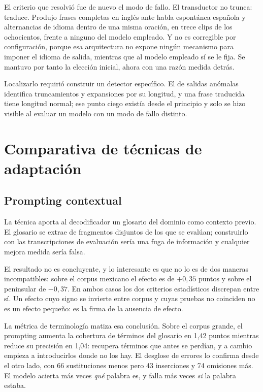 El criterio que resolvió fue de nuevo el modo de fallo. El transductor no trunca: traduce.
Produjo frases completas en inglés ante habla espontánea española y alternancias de idioma
dentro de una misma oración, en trece clips de los ochocientos, frente a ninguno del modelo
empleado. Y no es corregible por configuración, porque esa arquitectura no expone ningún
mecanismo para imponer el idioma de salida, mientras que al modelo empleado sí se le fija.
Se mantuvo por tanto la elección inicial, ahora con una razón medida detrás.

Localizarlo requirió construir un detector específico. El de salidas anómalas identifica
truncamientos y expansiones por su longitud, y una frase traducida tiene longitud normal;
ese punto ciego existía desde el principio y solo se hizo visible al evaluar un modelo con
un modo de fallo distinto.

\section{Comparativa de técnicas de adaptación}



\subsection{Prompting contextual}

La técnica aporta al decodificador un glosario del dominio como contexto previo. El
glosario se extrae de fragmentos disjuntos de los que se evalúan; construirlo con las
transcripciones de evaluación sería una fuga de información y cualquier mejora medida
sería falsa.

El resultado no es concluyente, y lo interesante es que no lo es de dos maneras
incompatibles: sobre el corpus mexicano el efecto es de $+0{,}35$ puntos y sobre el
peninsular de $-0{,}37$. En ambos casos los dos criterios estadísticos discrepan entre sí.
Un efecto cuyo signo se invierte entre corpus y cuyas pruebas no coinciden no es un efecto
pequeño: es la firma de la ausencia de efecto.

La métrica de terminología matiza esa conclusión. Sobre el corpus grande, el prompting
aumenta la cobertura de términos del glosario en 1,42 puntos mientras reduce su precisión
en 1,04: recupera términos que antes se perdían, y a cambio empieza a introducirlos donde
no los hay. El desglose de errores lo confirma desde el otro lado, con 66 sustituciones
menos pero 43 inserciones y 74 omisiones más. El modelo acierta más veces \emph{qué}
palabra es, y falla más veces \emph{si} la palabra estaba.

